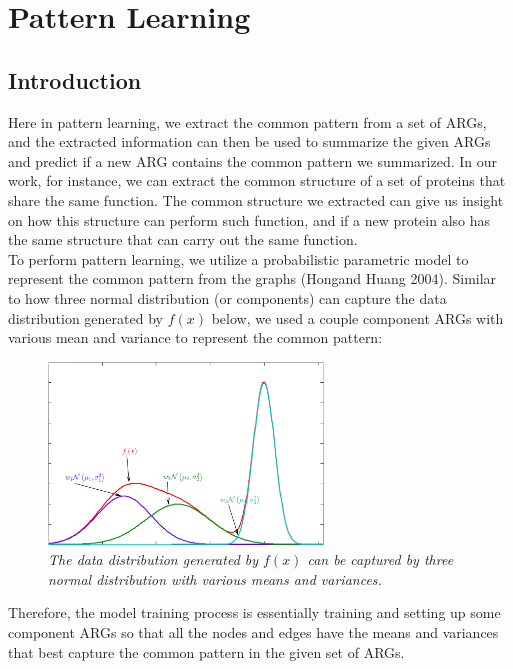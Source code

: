 \chapter{Pattern Learning}

\section{Introduction}

Here in pattern learning, we extract the common pattern from a set of ARGs, and the extracted information can then be used to summarize the given ARGs and predict if a new ARG contains the common pattern we summarized. In our work, for instance, we can extract the common structure of a set of proteins that share the same function. The common structure we extracted can give us insight on how this structure can perform such function, and if a new protein also has the same structure that can carry out the same function.\\

To perform pattern learning, we utilize a probabilistic parametric model to represent the common pattern from the graphs (Hong\footnotemark and Huang 2004). Similar to how three normal distribution (or components) can capture the data distribution generated by $f(x)$ below, we used a couple component ARGs with various mean and variance to represent the common pattern:

\begin{figure}[h]
	\centering
	\captionsetup{justification=centering}
	\includegraphics[width=0.65\textwidth]{figs/mixture.png}
	\caption[Caption for LOF]{\emph{The data distribution generated by $f(x)$ can be captured by three normal distribution with various means and variances.}}
	\label{fig:mixture}
\end{figure}

Therefore, the model training process is essentially training and setting up some component ARGs so that all the nodes and edges have the means and variances that best capture the common pattern in the given set of ARGs.\\

